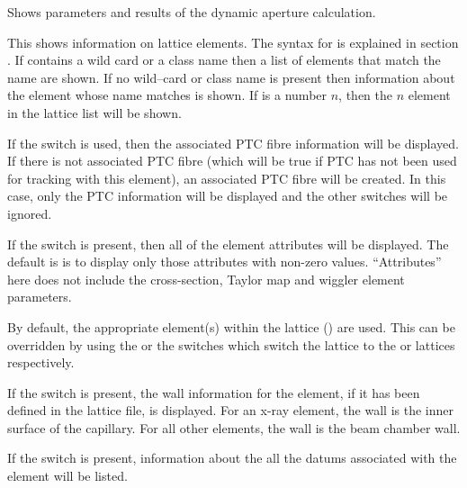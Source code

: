 {{{\begin{description}
\vskip -0.2in

Shows parameters and results of the dynamic aperture calculation.


\item[\protect\parbox{6in}{
  show element \{-all\_attributes\} \{-base\} \{-data\} \{-design\} \{-everything\} \{-field\} \\
  \hspace*{0.35in} \{-floor_coords\} \{-no_slaves\} \{-ptc\} \{-taylor\} \{-wall\} \{-xfer_mat\} <ele\_name> }] \Newline

\vskip -0.1in

This shows information on lattice elements. The syntax for  
is explained in section . If
 contains a wild card or a class name then a list of
elements that match the name are shown. If no wild--card or class name
is present then information about the element whose name matches
 is shown. If  is a number $n$, then the $n$\Th
element in the lattice list will be shown.

If the  switch is used, then the associated PTC fibre
information will be displayed. If there is not associated PTC fibre
(which will be true if PTC has not been used for tracking with this
element), an associated PTC fibre will be created. In this case, only
the PTC information will be displayed and the other switches will be
ignored.

If the  switch is present, then all of the element attributes
will be displayed. The default is is to display only those attributes
with non-zero values. ``Attributes'' here does not include the cross-section,
Taylor map and wiggler element parameters.

By default, the appropriate element(s) within the  lattice
() are used. This can be overridden by using the
 or the  switches which switch the lattice to
the  or  lattices respectively.

If the  switch is present, the wall information for the
element, if it has been defined in the lattice file, is displayed. For
an x-ray  element, the wall is the inner surface of the
capillary. For all other elements, the wall is the beam chamber wall.

If the  switch is present, information about the 
all the datums associated with the element will be listed. 


\end{description}}}}

